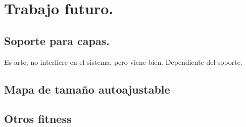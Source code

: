 \chapter{Trabajo futuro.}\label{cap:capitulo7}


\section{Soporte para capas.}

Es arte, no interfiere en el sistema, pero viene bien. Dependiente del soporte.


\section{Mapa de tamaño autoajustable}


\section{Otros fitness}



